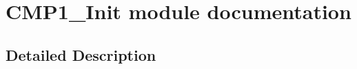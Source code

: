 \hypertarget{group___c_m_p1___init__module}{}\section{C\+M\+P1\+\_\+\+Init module documentation}
\label{group___c_m_p1___init__module}


\subsection{Detailed Description}
